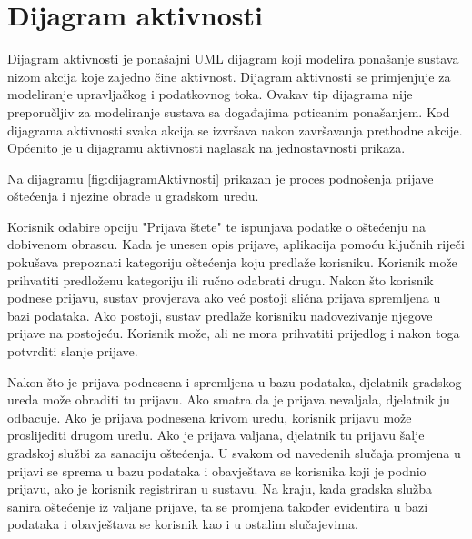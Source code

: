 			\eject 
			
			\section{Dijagram aktivnosti}
			
			Dijagram aktivnosti je ponašajni UML dijagram koji modelira ponašanje sustava nizom akcija koje zajedno čine aktivnost. Dijagram aktivnosti se primjenjuje za modeliranje upravljačkog i podatkovnog toka. Ovakav tip dijagrama nije preporučljiv za modeliranje sustava sa događajima poticanim ponašanjem. Kod dijagrama aktivnosti svaka akcija se izvršava nakon završavanja prethodne akcije. Općenito je u dijagramu aktivnosti naglasak na jednostavnosti prikaza.
			
			Na dijagramu \ref{fig:dijagramAktivnosti} prikazan je proces podnošenja prijave oštećenja i njezine obrade u gradskom uredu. 
			
			Korisnik odabire opciju "Prijava štete" te ispunjava podatke o oštećenju na dobivenom obrascu. Kada je unesen opis prijave, aplikacija pomoću ključnih riječi pokušava prepoznati kategoriju oštećenja koju predlaže korisniku. Korisnik može prihvatiti predloženu kategoriju ili ručno odabrati drugu. Nakon što korisnik podnese prijavu, sustav provjerava ako već postoji slična prijava spremljena u bazi podataka. Ako postoji, sustav predlaže korisniku nadovezivanje njegove prijave na postojeću. Korisnik može, ali ne mora prihvatiti prijedlog i nakon toga potvrditi slanje prijave.
			
			Nakon što je prijava podnesena i spremljena u bazu podataka, djelatnik gradskog ureda može obraditi tu prijavu. Ako smatra da je prijava nevaljala, djelatnik ju odbacuje. Ako je prijava podnesena krivom uredu, korisnik prijavu može proslijediti drugom uredu. Ako je prijava valjana, djelatnik tu prijavu šalje gradskoj službi za sanaciju oštećenja. U svakom od navedenih slučaja promjena u prijavi se sprema u bazu podataka i obavještava se korisnika koji je podnio prijavu, ako je korisnik registriran u sustavu. Na kraju, kada gradska služba sanira oštećenje iz valjane prijave, ta se promjena također evidentira u bazi podataka i obavještava se korisnik kao i u ostalim slučajevima. 
			
